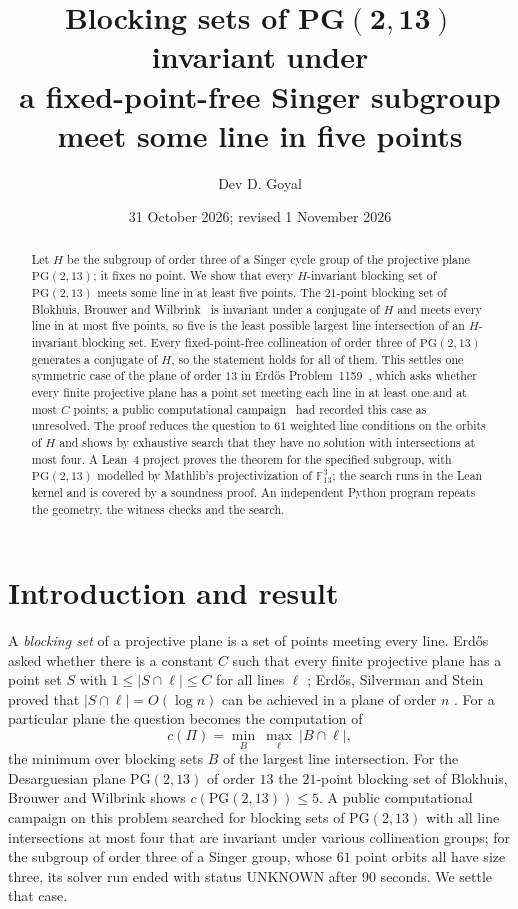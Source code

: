 \documentclass[11pt]{article}
\title{\textbf{Blocking sets of $\mathbf{PG(2,13)}$ invariant under\\a fixed-point-free Singer subgroup\\meet some line in five points}}
\author{Dev D. Goyal}
\date{31 October 2026; revised 1 November 2026}
\theoremstyle{remark}
\newcommand{\PG}{\mathrm{PG}(2,13)}
\newcommand{\F}{\mathbb{F}}
\begin{document}
\maketitle
\begin{abstract}
Let $H$ be the subgroup of order three of a Singer cycle group of the
projective plane $\PG$; it fixes no point. We show that every $H$-invariant
blocking set of $\PG$ meets some line in at least five points. The
$21$-point blocking set of Blokhuis, Brouwer and Wilbrink~\cite{BBW} is invariant under
a conjugate of $H$ and meets every line in at most five points, so five is
the least possible largest line intersection of an $H$-invariant blocking
set. Every fixed-point-free collineation of order three of $\PG$ generates a
conjugate of $H$, so the statement holds for all of them. This settles one
symmetric case of the plane of order $13$ in Erd\H{o}s Problem~1159~\cite{EP1159},
which asks whether every finite projective plane has a point set meeting each
line in at least one and at most $C$ points; a public computational
campaign~\cite{campaign} had recorded this case as unresolved. The proof reduces the question to $61$
weighted line conditions on the orbits of $H$ and shows by exhaustive search
that they have no solution with intersections at most four. A Lean~4 project
proves the theorem for the specified subgroup, with $\PG$ modelled by
Mathlib's projectivization of $\F_{13}^3$; the search runs in the Lean kernel
and is covered by a soundness proof. An independent Python program repeats
the geometry, the witness checks and the search.
\end{abstract}

\section{Introduction and result}

A \emph{blocking set} of a projective plane is a set of points meeting every
line. Erd\H{o}s asked whether there is a constant $C$ such that every finite
projective plane has a point set $S$ with $1\le|S\cap\ell|\le C$ for all lines
$\ell$ \cite{EP1159}; Erd\H{o}s, Silverman and Stein proved that
$|S\cap\ell|=O(\log n)$ can be achieved in a plane of order $n$
\cite{ESS}. For a particular plane the question becomes the computation of
\[
  c(\Pi)=\min_{B}\ \max_{\ell}\ |B\cap\ell|,
\]
the minimum over blocking sets $B$ of the largest line intersection. For the
Desarguesian plane $\PG$ of order $13$ the $21$-point blocking set of
Blokhuis, Brouwer and Wilbrink \cite{BBW} shows $c(\PG)\le5$. A public
computational campaign on this problem \cite{campaign} searched for blocking
sets of $\PG$ with all line intersections at most four that are invariant
under various collineation groups; for the subgroup of order three of a
Singer group, whose $61$ point orbits all have size three, its solver run
ended with status UNKNOWN after 90 seconds. We settle that case.
\end{document}
